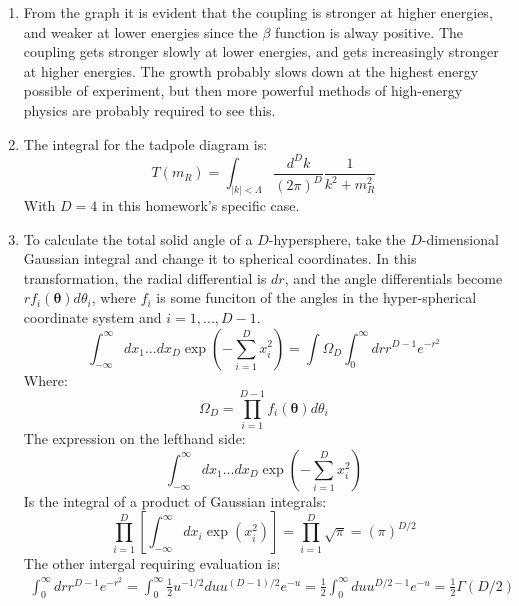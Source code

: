 \documentclass[12pt,a4]{article}
\begin{document}
\begin{enumerate}
\begin{enumerate}
      \item
        From the graph it is evident that the coupling is stronger at higher energies, and weaker at lower energies since the $\beta$ function is alway positive.
        The coupling gets stronger slowly at lower energies, and gets increasingly stronger at higher energies.
        The growth probably slows down at the highest energy possible of experiment, but then more powerful methods of high-energy physics are probably required to see this.
      \item
        The integral for the tadpole diagram is:
        \begin{equation*}
          T(m_R) = \int_{|k| < \Lambda} \frac{d^D k}{(2 \pi)^D} \frac{1}{k^2 + m_R^2}
        \end{equation*}
        With $D = 4$ in this homework's specific case.
      \item
        To calculate the total solid angle of a $D$-hypersphere, take the $D$-dimensional Gaussian integral and change it to spherical coordinates.
        In this transformation, the radial differential is $dr$, and the angle differentials become $r f_i(\pmb{\theta}) d \theta_i$, where $f_i$ is some funciton of the angles in the hyper-spherical coordinate system and $i = 1, ..., D-1$.
        \begin{equation*}
          \int_{-\infty}^{\infty} dx_1 ... dx_D\exp\left(-\sum_{i = 1}^Dx_i^2\right) = \int \Omega_D \int_0^\infty dr r^{D - 1} e^{-r^2}
        \end{equation*}
        Where:
        \begin{equation*}
          \Omega_D = \prod_{i = 1}^{D - 1} f_i(\pmb{\theta}) d \theta_i
        \end{equation*}
        The expression on the lefthand side:
        \begin{equation*}
          \int_{-\infty}^{\infty} dx_1 ... dx_D\exp\left(-\sum_{i = 1}^Dx_i^2\right) 
        \end{equation*}
        Is the integral of a product of Gaussian integrals:
        \begin{equation*}
          \prod_{i = 1}^D\left[\int_{-\infty}^{\infty} dx_i \exp\left(x_i^2\right) \right] = \prod_{i = 1}^D\sqrt{\pi} = (\pi)^{D / 2}
        \end{equation*}
        The other intergal requiring evaluation is:
        \begin{align*}
          \int_0^\infty dr r^{D- 1} e^{-r^2} = \int_0^\infty \frac{1}{2} u^{-1 / 2} du u^{(D - 1)/2} e^{-u} = \frac{1}{2} \int_0^\infty  du u^{D/2 - 1} e^{-u} = \frac{1}{2} \Gamma(D / 2)

\end{align*}
\end{enumerate}
\end{enumerate}
\end{document}
